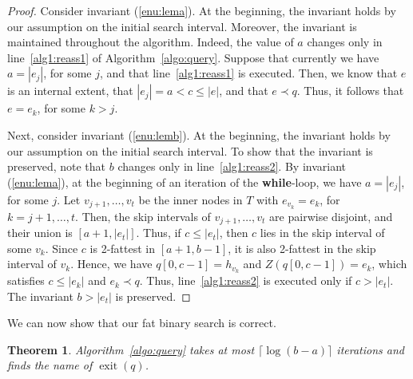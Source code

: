 \documentclass[a4paper,11pt]{article}
\newtheorem{theorem}{Theorem}[section]
\newcommand{\?}{\mskip1.5mu}
\DeclareMathOperator{\exit}{exit}
\begin{document}
\begin{proof}
Consider invariant (\ref{enu:lema}).
At the beginning, the invariant holds
by our assumption on the initial search interval. 
Moreover, the invariant is maintained throughout
the algorithm. Indeed, the value of
$a$ changes only in line~\ref{alg1:reass1} of Algorithm~\ref{algo:query}. 
Suppose that currently we have $a = |e_j|$, for some $j$, and
that line~\ref{alg1:reass1} is executed. Then, we know that $e$ is an 
internal extent, that $|e_j| = a  < c  \leq |e|$, 
and that $e \prec q$. Thus, it follows that $e = e_k$, 
for some $k > j$.

Next, consider invariant (\ref{enu:lemb}).
At the beginning, the invariant holds 
by our assumption on the initial search interval.
To show that the invariant is preserved,
note that $b$ changes only in 
line~\ref{alg1:reass2}.
By invariant (\ref{enu:lema}), at the beginning of
an iteration of the \textbf{while}-loop, we have $a = |e_j|$, 
for some $j$.  
Let $v_{j+1}, \dots, v_{t}$ be the inner nodes in $T$ 
with $e_{v_k} = e_k$, for $k = j + 1, \dots, t$.
Then, the skip intervals of $v_{j+1}, \dots, v_t$ are 
pairwise disjoint, and their union is $[a + 1, |e_t|]$.
Thus, if $c \leq |e_t|$, then $c$ lies in the
skip interval of some $v_k$.
Since $c$ is 2-fattest in $[a + 1, b - 1]$, 
it is also 2-fattest in the skip interval of $v_k$. 
Hence, we have $q[0, c - 1] = h_{v_k}$ and 
$Z(q[0, c - 1]) = e_k$, 
which satisfies $c \leq |e_k|$ and $e_k  \prec q$. 
Thus, line~\ref{alg1:reass2} is executed only if $c > |e_t|$.
The invariant $b > |e_t|$ is preserved.
\end{proof}

We can now show that our fat binary search is correct.
\begin{theorem}
\label{thm:correctnessfbs}
Algorithm~\ref{algo:query} takes at most $\lceil\log(b-a)\rceil$
iterations
and finds the name of $\exit(q)$.
\end{theorem}
\end{document}
